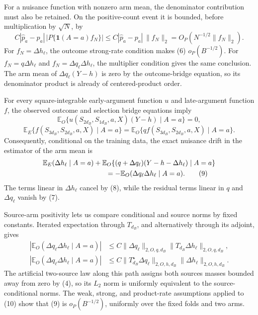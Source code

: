 For a nuisance function with nonzero arm mean, the denominator contribution must also be retained.  On the positive-count event it is bounded, before multiplication by \(\sqrt N\), by
\[
 C|\widehat p_a-p_a|\,|P\{\mathbf1(A=a)f_N\}|
 \le C|\widehat p_a-p_a|\,\|f_N\|_2
 =O_P(N^{-1/2}\|f_N\|_2).                               \tag{6}
\]
For \(f_N=\Delta h_\ell\), the outcome strong-rate condition makes (6) \(o_P(B^{-1/2})\).  For \(f_N=q\Delta h_\ell\) and \(f_N=\Delta q_\ell\Delta h_\ell\), the multiplier condition gives the same conclusion.  The arm mean of \(\Delta q_\ell(Y-h)\) is zero by the outcome-bridge equation, so its denominator product is already of centered-product order.

For every square-integrable early-argument function \(u\) and late-argument function \(f\), the observed outcome and selection bridge equations imply
\[
 \mathbb E_O\{u(S_{2d_B},S_{1d_B},a,X)(Y-h)\mid A=a\}=0, \tag{7}
\]
\[
 \mathbb E_E\{f(S_{3d_B},S_{2d_B},a,X)\mid A=a\}
 =\mathbb E_O\{qf(S_{3d_B},S_{2d_B},a,X)\mid A=a\}.       \tag{8}
\]
Consequently, conditional on the training data, the exact nuisance drift in the estimator of the arm mean is
\[
\begin{aligned}
 &\mathbb E_E(\Delta h_\ell\mid A=a)
 +\mathbb E_O\{(q+\Delta q_\ell)(Y-h-\Delta h_\ell)\mid A=a\}\\
 &\hspace{32mm}=-\mathbb E_O(\Delta q_\ell\Delta h_\ell\mid A=a). \tag{9}
\end{aligned}
\]
The terms linear in \(\Delta h_\ell\) cancel by (8), while the residual terms linear in \(q\) and \(\Delta q_\ell\) vanish by (7).

Source-arm positivity lets us compare conditional and source norms by fixed constants.  Iterated expectation through \(T_{d_B}\), and alternatively through its adjoint, gives
\[
\begin{aligned}
 |\mathbb E_O(\Delta q_\ell\Delta h_\ell\mid A=a)|
 &\le C\|\Delta q_\ell\|_{2,O,q,d_B}
       \|T_{d_B}\Delta h_\ell\|_{2,O,q,d_B},\\
 |\mathbb E_O(\Delta q_\ell\Delta h_\ell\mid A=a)|
 &\le C\|T_{d_B}^\star\Delta q_\ell\|_{2,O,h,d_B}
       \|\Delta h_\ell\|_{2,O,h,d_B}.                  \tag{10}
\end{aligned}
\]
The artificial two-source law along this path assigns both sources masses bounded away from zero by (4), so its \(L_2\) norm is uniformly equivalent to the source-conditional norms.  The weak, strong, and product-rate assumptions applied to (10) show that (9) is \(o_P(B^{-1/2})\), uniformly over the fixed folds and two arms.

